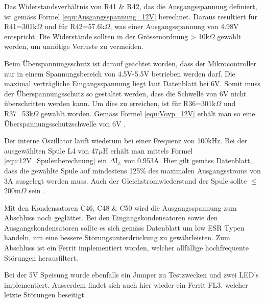 Das Widerstandsverhältnis von R41 \& R42, das die Ausgangsspannung definiert, ist gemäss Formel \ref{equ:Ausgangsspannung_12V} berechnet. Daraus resultiert für R41=301k$\Omega$ und für R42=57.6k$\Omega$, was einer Ausgangsspannung von 4.98V entspricht. Die Widerstände sollten in der Grössenordnung > 10k$\Omega$ gewählt werden, um unnötige Verluste zu vermeiden.  

Beim Überspannungsschutz ist darauf geachtet worden, dass der Mikrocontroller nur in einem Spannungsbereich von 4.5V-5.5V betrieben werden darf. Die maximal verträgliche Eingangsspannung liegt laut Datenblatt bei 6V. Somit muss der Überspannungsschutz so gestaltet werden, dass die Schwelle von 6V nicht überschritten werden kann. Um dies zu erreichen, ist für R36=301k$\Omega$ und R37=53k$\Omega$ gewählt worden. Gemäss Formel \ref{equ:Vovp_12V} erhält man so eine Überspannungsschutzschwelle von 6V \cite[S.1]{atmel_atmel_2014}.

Der interne Oszillator läuft wiederum bei einer Frequenz von 100kHz. Bei der ausgewählten Spule L4 von 47$\mu$H erhält man mittels Formel \ref{equ:12V_Spulenberechnung} ein $\Delta$I$_{L}$ von 0.953A. Hier gilt gemäss Datenblatt, dass die gewählte Spule auf mindestens 125\% des maximalen Ausgangsstroms von 3A ausgelegt werden muss. Auch der Gleichstromwiederstand der Spule sollte $ \leq \ $ 200m$\Omega$  sein \cite[S.3]{monolithic_power_systems_mp24943_2011}. 

Mit den Kondensatoren C46, C48 \& C50 wird die Ausgangsspannung zum Abschluss noch geglättet. Bei den Eingangskondensatoren sowie den Ausgangskondensatoren sollte es sich gemäss Datenblatt um low ESR Typen handeln, um eine bessere Störungsunterdrückung zu gewährleisten. Zum Abschluss ist ein Ferrit implementiert worden, welcher allfällige hochfrequente Störungen herausfiltert.

Bei der 5V Speisung wurde ebenfalls ein Jumper zu Testzwecken und zwei LED's implementiert. Ausserdem findet sich auch hier wieder ein Ferrit FL3, welcher letzte Störungen beseitigt. 



